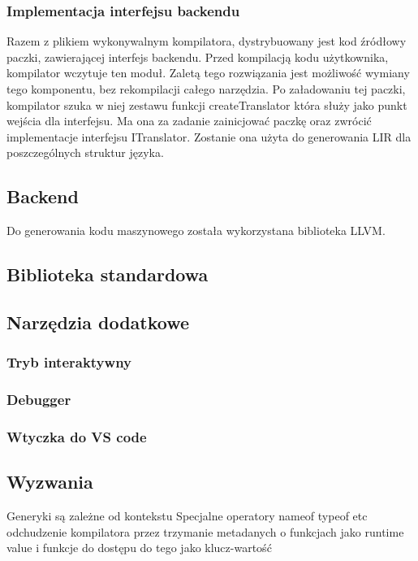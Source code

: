 \subsubsection{Implementacja interfejsu backendu}
Razem z plikiem wykonywalnym kompilatora, dystrybuowany jest kod źródłowy paczki, zawierającej interfejs backendu. Przed kompilacją kodu użytkownika, kompilator wczytuje ten moduł. Zaletą tego rozwiązania jest możliwość wymiany tego komponentu, bez rekompilacji całego narzędzia.
Po załadowaniu tej paczki, kompilator szuka w niej zestawu funkcji createTranslator która służy jako punkt wejścia dla interfejsu. Ma ona za zadanie zainicjować paczkę oraz zwrócić implementacje interfejsu ITranslator. Zostanie ona użyta do generowania LIR dla poszczególnych struktur języka.

\subsection{Backend}
Do generowania kodu maszynowego została wykorzystana biblioteka LLVM.
\subsection{Biblioteka standardowa}

\subsection{Narzędzia dodatkowe}

\subsubsection{Tryb interaktywny}

\subsubsection{Debugger}

\subsubsection{Wtyczka do VS code}
\subsection{Wyzwania}
Generyki są zależne od kontekstu
Specjalne operatory nameof typeof etc
odchudzenie kompilatora przez trzymanie metadanych o funkcjach jako runtime value i funkcje do dostępu do tego jako klucz-wartość